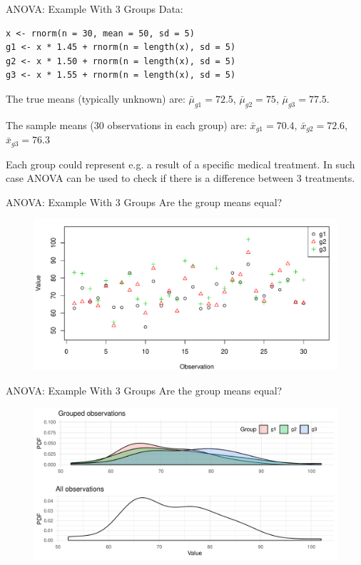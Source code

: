 \begin{frame}[fragile]{ANOVA: Example With 3 Groups}
    Data:
\begin{verbatim}
x <- rnorm(n = 30, mean = 50, sd = 5)
g1 <- x * 1.45 + rnorm(n = length(x), sd = 5)
g2 <- x * 1.50 + rnorm(n = length(x), sd = 5)
g3 <- x * 1.55 + rnorm(n = length(x), sd = 5)\end{verbatim}
    The true means (typically unknown) are: $\bar{\mu}_{g1} = 72.5$, $\bar{\mu}_{g2} = 75$, $\bar{\mu}_{g3} = 77.5$.
    
    The sample means (30 observations in each group) are: $\bar{x}_{g1} = 70.4$, $\bar{x}_{g2} = 72.6$, $\bar{x}_{g3} = 76.3$
    
    Each group could represent e.g. a result of a specific medical treatment. In such case ANOVA can be used to check if there is a difference between 3 treatments.

\end{frame}

\begin{frame}{ANOVA: Example With 3 Groups}
    Are the group means equal?

    \begin{figure}
        \includegraphics[width=\linewidth]{R/plots/anova_3_groups_scatter}
    \end{figure}
\end{frame}

\begin{frame}{ANOVA: Example With 3 Groups}
    Are the group means equal?

    \begin{figure}
        \includegraphics[width=\linewidth]{R/plots/anova_3_groups_density}
    \end{figure}
\end{frame}

